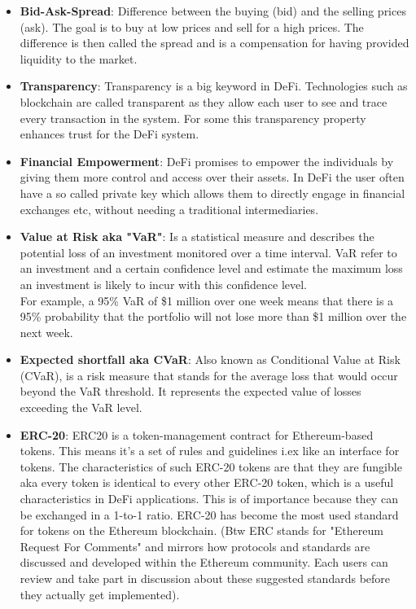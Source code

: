 \documentclass{article}
\begin{document}
\begin{itemize}
    \item \textbf{Bid-Ask-Spread}: Difference between the buying (bid) and the selling prices (ask). The goal is to buy at low prices and sell for a high prices. The difference is then called the spread and is a compensation for having provided liquidity to the market.
        
    \item \textbf{Transparency}: Transparency is a big keyword in DeFi. Technologies such as blockchain are called transparent as they allow each user to see and trace every transaction in the system. For some this transparency property enhances trust for the DeFi system.

    
     \item \textbf{Financial Empowerment}: DeFi promises to empower the individuals by giving them more control and access over their assets. In DeFi the user often have a so called private key which allows them to directly engage in financial exchanges etc, without needing a traditional intermediaries.
    
    \item \textbf{Value at Risk aka "VaR"}: Is a statistical measure and describes the potential loss of an investment monitored over a time interval. VaR refer to an investment and a certain confidence level and estimate the maximum loss an investment is likely to incur with this confidence level.\\
    For example, a 95\% VaR of \$1 million over one week means that there is a 95\% probability that the portfolio will not lose more than \$1 million over the next week.

    \item \textbf{Expected shortfall aka CVaR}:
    Also known as Conditional Value at Risk (CVaR), is a risk measure that stands for the average loss that would occur beyond the VaR threshold. It represents the expected value of losses exceeding the VaR level.  

    \item \textbf{ERC-20}: ERC20 is a token-management contract for Ethereum-based tokens. This means it's a set of rules and guidelines i.ex like an interface for tokens. The characteristics of such ERC-20 tokens are that they are fungible aka every token is identical to every other ERC-20 token, which is a useful characteristics in DeFi applications. This is of importance because they can be exchanged in a 1-to-1 ratio. ERC-20 has become the most used standard for tokens on the Ethereum blockchain.
    (Btw ERC stands for "Ethereum Request For Comments" and mirrors how protocols and standards are discussed and developed within the Ethereum community. Each users can review and take part in discussion about these suggested standards before they actually get implemented). 


\end{itemize}
\end{document}
